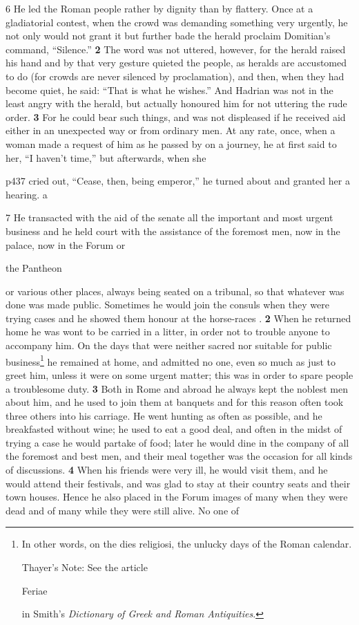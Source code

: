 6 He led the Roman people rather by dignity than by flattery. Once at a gladiatorial contest, when the crowd was demanding something very urgently, he not only would not grant it but further bade the herald proclaim Domitian's command, ``Silence.'' \textbf{2} The word was not uttered, however, for the herald raised his hand and by that very gesture quieted the people, as heralds are accustomed to do (for crowds are never silenced by proclamation), and then, when they had become quiet, he said: ``That is what he wishes.'' And Hadrian was not in the least angry with the herald, but actually honoured him for not uttering the rude order. \textbf{3} For he could bear such things, and was not displeased if he received aid either in an unexpected way or from ordinary men. At any rate, once, when a woman made a request of him as he passed by on a journey, he at first said to her, ``I haven't time,'' but afterwards, when she

p437 cried out, ``Cease, then, being emperor,'' he turned about and granted her a hearing.\texthebrew{⁠} a

7 He transacted with the aid of the senate all the important and most urgent business and he held court with the assistance of the foremost men, now in the palace, now in the Forum or

the Pantheon

or various other places, always being seated on a tribunal, so that whatever was done was made public. Sometimes he would join the consuls when they were trying cases and he showed them honour at the horse-races . \textbf{2} When he returned home he was wont to be carried in a litter, in order not to trouble anyone to accompany him. On the days that were neither sacred nor suitable for public business\texthebrew{⁠}\footnote{In other words, on the dies religiosi, the unlucky days of the Roman calendar.

Thayer's Note: See the article

Feriae

in Smith's \emph{Dictionary of Greek and Roman Antiquities}.

} he remained at home, and admitted no one, even so much as just to greet him, unless it were on some urgent matter; this was in order to spare people a troublesome duty. \textbf{3} Both in Rome and abroad he always kept the noblest men about him, and he used to join them at banquets and for this reason often took three others into his carriage. He went hunting as often as possible, and he breakfasted without wine; he used to eat a good deal, and often in the midst of trying a case he would partake of food; later he would dine in the company of all the foremost and best men, and their meal together was the occasion for all kinds of discussions. \textbf{4} When his friends were very ill, he would visit them, and he would attend their festivals, and was glad to stay at their country seats and their town houses. Hence he also placed in the Forum images of many when they were dead and of many while they were still alive. No one of

